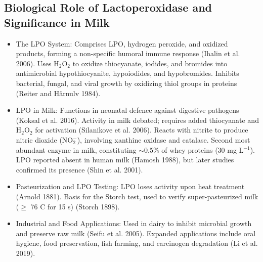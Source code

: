 \subsection*{Biological Role of Lactoperoxidase and Significance in Milk}
\begin{itemize}
    \item The LPO System:
    \subitem Comprises LPO, hydrogen peroxide, and oxidized products, forming a non-specific humoral immune response (Ihalin et al. 2006).
    \subitem Uses H$_2$O$_2$ to oxidize thiocyanate, iodides, and bromides into antimicrobial hypothiocyanite, hypoiodides, and hypobromides.
    \subitem Inhibits bacterial, fungal, and viral growth by oxidizing thiol groups in proteins (Reiter and Härnulv 1984).

    \item LPO in Milk:
    \subitem Functions in neonatal defence against digestive pathogens (Koksal et al. 2016).
    \subitem Activity in milk debated; requires added thiocyanate and H$_2$O$_2$ for activation (Silanikove et al. 2006).
    \subitem Reacts with nitrite to produce nitric dioxide (NO$_2^-$), involving xanthine oxidase and catalase.
    \subitem Second most abundant enzyme in milk, constituting $\sim$0.5\% of whey proteins (30 mg L$^{-1}$).
    \subitem LPO reported absent in human milk (Hamosh 1988), but later studies confirmed its presence (Shin et al. 2001).

    \item Pasteurization and LPO Testing:
    \subitem LPO loses activity upon heat treatment (Arnold 1881).
    \subitem Basis for the Storch test, used to verify super-pasteurized milk ($\geq$ 76 \textdegree C for 15 s) (Storch 1898).

    \item Industrial and Food Applications:
    \subitem Used in dairy to inhibit microbial growth and preserve raw milk (Seifu et al. 2005).
    \subitem Expanded applications include oral hygiene, food preservation, fish farming, and carcinogen degradation (Li et al. 2019).
\end{itemize}

